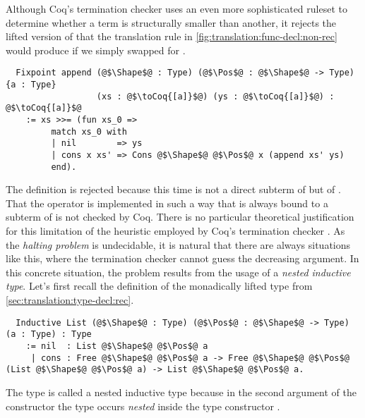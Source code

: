 Although Coq's termination checker uses an even more sophisticated ruleset to determine whether a term is structurally smaller than another, it rejects the lifted version of  that the translation rule in \autoref{fig:translation:func-decl:non-rec} would produce if we simply swapped  for .
\begin{verbatim}
  Fixpoint append (@$\Shape$@ : Type) (@$\Pos$@ : @$\Shape$@ -> Type) {a : Type}
                  (xs : @$\toCoq{[a]}$@) (ys : @$\toCoq{[a]}$@) : @$\toCoq{[a]}$@
    := xs >>= (fun xs_0 =>
         match xs_0 with
         | nil        => ys
         | cons x xs' => Cons @$\Shape$@ @$\Pos$@ x (append xs' ys)
         end).
\end{verbatim}
The definition is rejected because this time  is not a direct subterm of  but of .
That the \coq{>>=} operator is implemented in such a way that  is always bound to a subterm of  is not checked by Coq.
There is no particular theoretical justification for this limitation of the heuristic employed by Coq's termination checker \cite[p.~62]{Chlipala:2013}.
As the \textit{halting problem} is undecidable, it is natural that there are always situations like this, where the termination checker cannot guess the decreasing argument.
In this concrete situation, the problem results from the usage of a \textit{nested inductive type}.
Let's first recall the definition of the monadically lifted  type from \autoref{sec:translation:type-decl:rec}.
\begin{verbatim}
  Inductive List (@$\Shape$@ : Type) (@$\Pos$@ : @$\Shape$@ -> Type) (a : Type) : Type
    := nil  : List @$\Shape$@ @$\Pos$@ a
     | cons : Free @$\Shape$@ @$\Pos$@ a -> Free @$\Shape$@ @$\Pos$@ (List @$\Shape$@ @$\Pos$@ a) -> List @$\Shape$@ @$\Pos$@ a.
\end{verbatim}
The  type is called a nested inductive type because in the second argument of the  constructor the type  occurs \textit{nested} inside the type constructor  \cite[p.~29]{Dylus:2018}.

